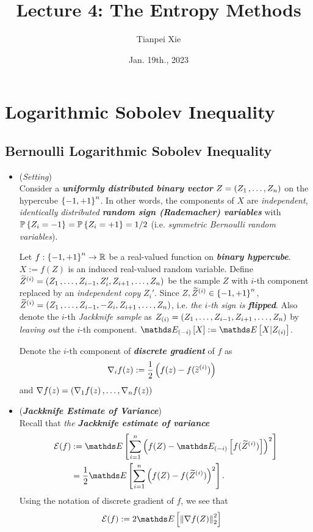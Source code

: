 \documentclass[11pt]{article}
\begin{document}
\title{Lecture 4: The Entropy Methods}
\author{ Tianpei Xie}
\date{Jan. 19th., 2023 }
\maketitle
\tableofcontents
\newpage
\section{Logarithmic Sobolev Inequality}
\subsection{Bernoulli Logarithmic Sobolev Inequality}
\begin{itemize}
\item \begin{remark} (\emph{Setting})\\
Consider a \emph{\textbf{uniformly distributed binary vector}} $Z = (Z_1 \,{,}\ldots{,}\, Z_n)$ on the hypercube $\left\{-1, +1\right\}^n$. In other words, the components of $X$ are \emph{independent}, \emph{identically distributed} \emph{\textbf{random sign (Rademacher) variables}} with ${\mathbb P}\left\{Z_i = -1\right\} = {\mathbb P}\left\{Z_i = +1\right\} = 1/2$ (i.e. \emph{symmetric Bernoulli random variables}). 

Let $f: \left\{-1, +1\right\}^n \to {\mathbb R}$ be a real-valued function on \emph{\textbf{binary hypercube}}. $X := f(Z)$ is an induced real-valued random variable. Define $\widetilde{Z}^{(i)} = (Z_1 \,{,}\ldots{,}\, Z_{i-1}, Z_{i}', Z_{i+1} \,{,}\ldots{,}\, Z_n)$ be the sample $Z$ with $i$-th component replaced by an \emph{independent copy} $Z_{i}'$. Since $Z, \widetilde{Z}^{(i)} \in \left\{-1, +1\right\}^n$, $\widetilde{Z}^{(i)} = (Z_1 \,{,}\ldots{,}\, Z_{i-1}, -Z_{i}, Z_{i+1} \,{,}\ldots{,}\, Z_n)$, i.e. \emph{the $i$-th sign is \textbf{flipped}}. Also denote the $i$-th \emph{Jackknife sample} as $Z_{(i)} = (Z_1 \,{,}\ldots{,}\, Z_{i-1},  Z_{i+1} \,{,}\ldots{,}\, Z_n)$ by \emph{leaving out} the $i$-th component. $\E{(-i)}{X} := \E{}{X | Z_{(i)}}$.

Denote the $i$-th component of \emph{\textbf{discrete gradient}} of $f$ as
\begin{align*}
\nabla_{i}f(z) &:= \frac{1}{2}\left(f(z) - f(\widetilde{z}^{(i)})\right)
\end{align*} and $\nabla f(z) = (\nabla_{1}f(z) \,{,}\ldots{,}\, \nabla_{n}f(z) )$
\end{remark}

\item \begin{remark} (\emph{\textbf{Jackknife Estimate of Variance}})\\
Recall that \emph{the \textbf{Jackknife estimate of variance}}
\begin{align*}
\cE(f) &:= \E{}{\sum_{i=1}^{n}\paren{f(Z) - \E{(-i)}{f(\widetilde{Z}^{(i)})} }^2}\\
& = \frac{1}{2}\E{}{\sum_{i=1}^{n}\paren{f(Z) - f(\widetilde{Z}^{(i)}) }^2}.
\end{align*} Using the notation of discrete gradient of $f$, we see that
\begin{align*}
\cE(f) &:= 2\E{}{\norm{\nabla f(Z)}{2}^2}
\end{align*}
\end{remark}


\end{itemize}
\end{document}
